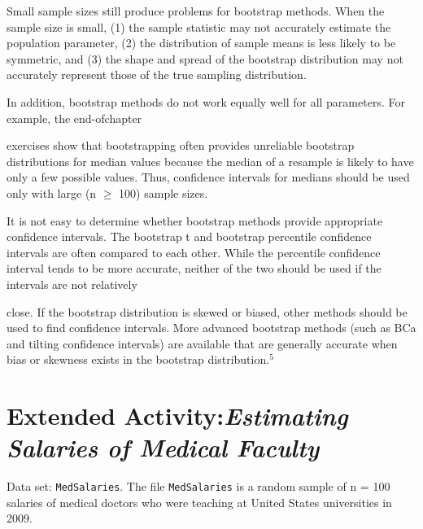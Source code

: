 \documentclass[
]{report}
\begin{document}
Small sample sizes still produce problems for bootstrap methods. When the sample size is small, (1) the sample statistic may not accurately estimate the population parameter, (2) the distribution of sample means is less likely to be symmetric, and (3) the shape and spread of the bootstrap distribution may not accurately represent those of the true sampling distribution.

In addition, bootstrap methods do not work equally well for all parameters. For example, the end-ofchapter

exercises show that bootstrapping often provides unreliable bootstrap distributions for median values because the median of a resample is likely to have only a few possible values. Thus, confidence intervals for medians should be used only with large (n \(\geq\) 100) sample sizes.

It is not easy to determine whether bootstrap methods provide appropriate confidence intervals. The bootstrap t and bootstrap percentile confidence intervals are often compared to each other. While the percentile confidence interval tends to be more accurate, neither of the two should be used if the intervals are not relatively

close. If the bootstrap distribution is skewed or biased, other methods should be used to find confidence intervals. More advanced bootstrap methods (such as BCa and tilting confidence intervals) are available that are generally accurate when bias or skewness exists in the bootstrap distribution.\(^5\)

\section*{\texorpdfstring{Extended Activity:\emph{Estimating Salaries of Medical Faculty}}{Extended Activity:Estimating Salaries of Medical Faculty}}\label{extended-activityestimating-salaries-of-medical-faculty}

Data set: \texttt{MedSalaries}.
The file \texttt{MedSalaries} is a random sample of n = 100 salaries of medical doctors who were teaching at United States universities in 2009.
\end{document}
